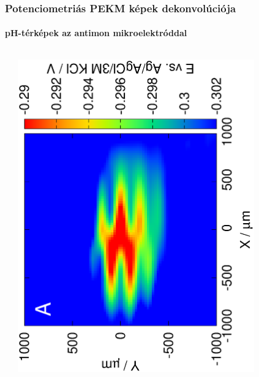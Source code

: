 \documentclass{beamer}
\begin{document}
\begin{frame}
        \frametitle{Potenciometriás PEKM képek dekonvolúciója}
        \framesubtitle{pH-térképek az antimon mikroelektróddal}
\centering

\def\s{0.15}

\begin{columns}[T] %

\begin{column}{.2\textwidth}
\begin{minipage}[c][0.75\textheight][c]{\linewidth}
\centering
\end{minipage}
\end{column}%
\hfill%
\begin{column}{.2\textwidth}
\centering
\includegraphics[trim = 10mm 30mm 0mm 10mm, clip, width=0.8\textwidth, angle=-90]{13121313.eps}\\

\end{column}
\end{columns}
\end{frame}
\end{document}
